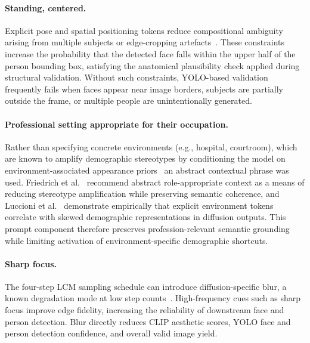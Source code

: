 \paragraph{Standing, centered.}
Explicit pose and spatial positioning tokens reduce compositional ambiguity
arising from multiple subjects or edge-cropping
artefacts~\cite{Nichol_2022_GLIDE, Chen_2023_T2ICompBench}. These
constraints increase the probability that the detected face falls within
the upper half of the person bounding box, satisfying the anatomical
plausibility check applied during structural validation. Without such
constraints, YOLO-based validation frequently fails when faces appear near
image borders, subjects are partially outside the frame, or multiple people
are unintentionally generated.

\paragraph{Professional setting appropriate for their occupation.}
Rather than specifying concrete environments (e.g., hospital, courtroom),
which are known to amplify demographic stereotypes by conditioning the model
on environment-associated appearance priors~\cite{Luccioni_2023_AnalyzingSocietalRepresentationsDiffusionModels} 
an abstract contextual phrase was used. Friedrich et
al.~\cite{Friedrich_2023_FairDiffusionInstructingTextToImage} recommend abstract role-appropriate
context as a means of reducing stereotype amplification while preserving
semantic coherence, and Luccioni et al.~\cite{Luccioni_2023_AnalyzingSocietalRepresentationsDiffusionModels} %
demonstrate empirically that explicit environment tokens correlate with
skewed demographic representations in diffusion outputs. This prompt
component therefore preserves profession-relevant semantic grounding while
limiting activation of environment-specific demographic shortcuts.

\paragraph{Sharp focus.}
The four-step LCM sampling schedule can introduce diffusion-specific blur,
a known degradation mode at low step counts~\cite{Luo_2023_LCMLoRA}.
High-frequency cues such as sharp focus improve edge fidelity, increasing
the reliability of downstream face and person detection. Blur directly
reduces CLIP aesthetic scores, YOLO face and person detection confidence,
and overall valid image yield.

